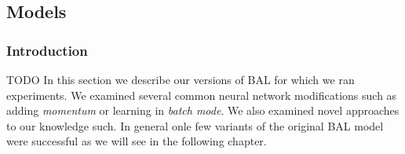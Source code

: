 \subsection{Models}

\subsubsection*{Introduction} 
TODO 
In this section we describe our versions of BAL for which we ran experiments. We examined several common neural network modifications such as adding \emph{momentum} or learning in \emph{batch mode}. We also examined novel approaches to our knowledge such. In general onle few variants of the original BAL model were successful as we will see in the following chapter. 


 



 
  
 

 

